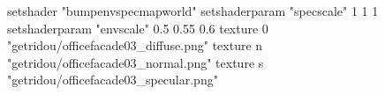 setshader "bumpenvspecmapworld"
setshaderparam "specscale" 1 1 1
setshaderparam "envscale"  0.5 0.55 0.6
    texture 0 "getridou/officefacade03_diffuse.png"
    texture n "getridou/officefacade03_normal.png"
    texture s "getridou/officefacade03_specular.png"
